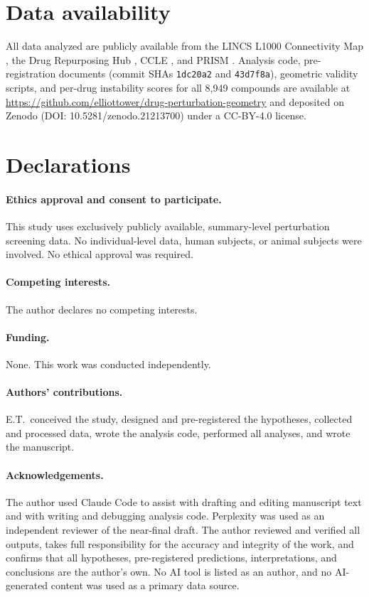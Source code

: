 \documentclass[11pt]{article}
\begin{document}
\section*{Data availability}

All data analyzed are publicly available from the LINCS L1000
Connectivity Map \citep{subramanian2017next}, the Drug Repurposing Hub
\citep{corsello2017drug}, CCLE \citep{barretina2012cancer}, and PRISM
\citep{corsello2020discovering}.  Analysis code, pre-registration
documents (commit SHAs \texttt{1dc20a2} and \texttt{43d7f8a}),
geometric validity scripts, and per-drug instability scores for all
8{,}949 compounds are available at
\url{https://github.com/elliottower/drug-perturbation-geometry} and
deposited on Zenodo (DOI: 10.5281/zenodo.21213700) under a CC-BY-4.0
license.

\section*{Declarations}

\paragraph{Ethics approval and consent to participate.}
This study uses exclusively publicly available, summary-level
perturbation screening data.  No individual-level data, human subjects,
or animal subjects were involved.  No ethical approval was required.

\paragraph{Competing interests.}
The author declares no competing interests.

\paragraph{Funding.}
None.  This work was conducted independently.

\paragraph{Authors' contributions.}
E.T.\ conceived the study, designed and pre-registered the hypotheses,
collected and processed data, wrote the analysis code, performed all
analyses, and wrote the manuscript.

\paragraph{Acknowledgements.}
The author used Claude Code \citep{claudecode} to assist with drafting
and editing manuscript text and with writing and debugging analysis
code.  Perplexity \citep{perplexityai} was used as an independent
reviewer of the near-final draft.  The author reviewed and verified all
outputs, takes full responsibility for the accuracy and integrity of the
work, and confirms that all hypotheses, pre-registered predictions,
interpretations, and conclusions are the author's own.  No AI tool is
listed as an author, and no AI-generated content was used as a primary
data source.
\end{document}
